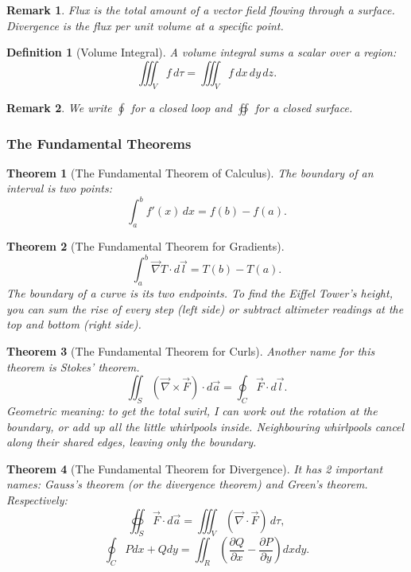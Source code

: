 \documentclass{article}
\newtheorem{theorem}{Theorem}
\newtheorem{definition}{Definition}
\newtheorem{remark}{Remark}
\begin{document}
\begin{remark}
    Flux is the total amount of a vector field flowing through a surface. Divergence is the flux per unit volume at a specific point.
\end{remark}
\begin{definition}[Volume Integral]
    A volume integral sums a scalar over a region:
    \[\iiint_V f\,d\tau = \iiint_V f\,dx\,dy\,dz.\]
\end{definition}
\begin{remark}
    We write $\oint$ for a closed loop and $\oiint$ for a closed surface.
\end{remark}

\subsubsection{The Fundamental Theorems}
\begin{theorem}[The Fundamental Theorem of Calculus]
    The boundary of an interval is two points:
    \[\int_a^b f'(x)\,dx = f(b) - f(a).\]
\end{theorem}
\begin{theorem}[The Fundamental Theorem for Gradients]
    \[\int_a^b \vec{\nabla}T \cdot d\vec{l} = T(b) - T(a).\]
    The boundary of a curve is its two endpoints. To find the Eiffel Tower's height, you can sum the rise of every step (left side) or subtract altimeter readings at the top and bottom (right side).
\end{theorem}
\begin{theorem}[The Fundamental Theorem for Curls]
    Another name for this theorem is Stokes' theorem.
    \begin{equation}
        \label{Stokes}
        \iint_S (\vec{\nabla}\times\vec{F})\cdot d\vec{a} = \oint_C \vec{F}\cdot d\vec{l}.
    \end{equation}
    Geometric meaning: to get the total swirl, I can work out the rotation at the boundary, or add up all the little whirlpools inside. Neighbouring whirlpools cancel along their shared edges, leaving only the boundary.
\end{theorem}
\begin{theorem}[The Fundamental Theorem for Divergence]
    \label{FTD}
    It has 2 important names: Gauss's theorem (or the divergence theorem) and Green's theorem. Respectively:
    \[\oiint_S \vec{F}\cdot d\vec{a} = \iiint_V(\vec{\nabla}\cdot\vec{F})\,d\tau,\]
    \[\oint_C Pdx + Qdy = \iint_R (\frac{\partial Q}{\partial x}-\frac{\partial P}{\partial y}) dxdy.\]
\end{theorem}
\end{document}
